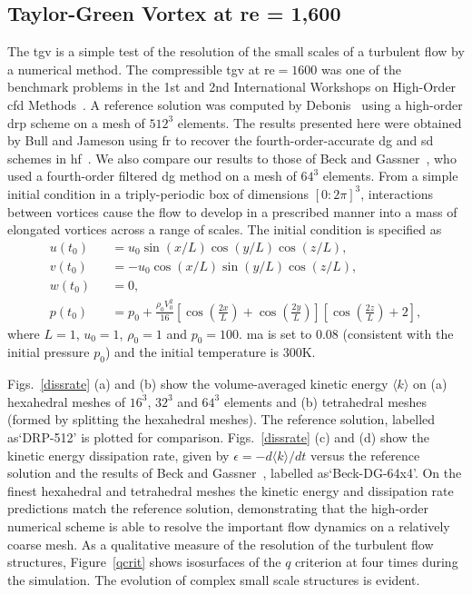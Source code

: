 \graphicspath{{\aiaadir /figures_taylorgreen/}}%

\subsection{Taylor-Green Vortex at \gls{re} = 1,600}

The \gls{tgv} is a simple test of the resolution of the small scales of a turbulent flow by a numerical method.
The compressible \gls{tgv} at \gls{re}$=1600$ was one of the benchmark problems in the 1st and 2nd International Workshops on High-Order \gls{cfd} Methods~\cite{wang2013high}.
A reference solution was computed by Debonis~\cite{debonis:13} using a high-order \gls{drp} scheme on a mesh of $512^3$ elements.
The results presented here were obtained by Bull and Jameson using \gls{fr} to recover the fourth-order-accurate \gls{dg} and \gls{sd} schemes in \gls{hf}~\cite{bull2014a,bull2014b}.
We also compare our results to those of Beck and Gassner~\cite{beck:12}, who used a fourth-order filtered \gls{dg} method on a mesh of $64^3$ elements.
From a simple initial condition in a triply-periodic box of dimensions $[0:2\pi]^3$, interactions between vortices cause the flow to develop in a prescribed manner into a mass of elongated vortices across a range of scales.
The initial condition is specified as
%
\begin{eqnarray}\label{tgv}
u(t_0) &&= u_0 \sin (x/L) \cos (y/L) \cos (z/L), \\
v(t_0) &&= -u_0 \cos (x/L) \sin (y/L) \cos (z/L), \\
w(t_0) &&= 0, \\
p(t_0) &&= p_0 + \frac{\rho_0 V^2_0}{16} \left [ \cos \left (\frac{2x}{L} \right ) + \cos \left (\frac{2y}{L} \right ) \right ] \left [ \cos \left (\frac{2z}{L} \right ) + 2 \right ],
\end{eqnarray}
%
where $L = 1$, $u_0 = 1$, $\rho_0 = 1$ and $p_0 = 100$.
\gls{ma} is set to 0.08 (consistent with the initial pressure $p_0$) and the initial temperature is 300K.

Figs.~\ref{dissrate} (a) and (b) show the volume-averaged kinetic energy $\langle k \rangle$  on (a) hexahedral meshes of $16^3$, $32^3$ and $64^3$ elements and (b) tetrahedral meshes (formed by splitting the hexahedral meshes).
The reference solution, labelled as`DRP-512' is plotted for comparison.
Figs.~\ref{dissrate} (c) and (d) show the kinetic energy dissipation rate, given by $\epsilon = -d \langle k \rangle/dt$ versus the reference solution and the results of Beck and Gassner~\cite{beck:12}, labelled as`Beck-DG-64x4'.
On the finest hexahedral and tetrahedral meshes the kinetic energy and dissipation rate predictions match the reference solution, demonstrating that the high-order numerical scheme is able to resolve the important flow dynamics on a relatively coarse mesh.
As a qualitative measure of the resolution of the turbulent flow structures, Figure~\ref{qcrit} shows isosurfaces of the $q$ criterion at four times during the simulation.
The evolution of complex small scale structures is evident.

